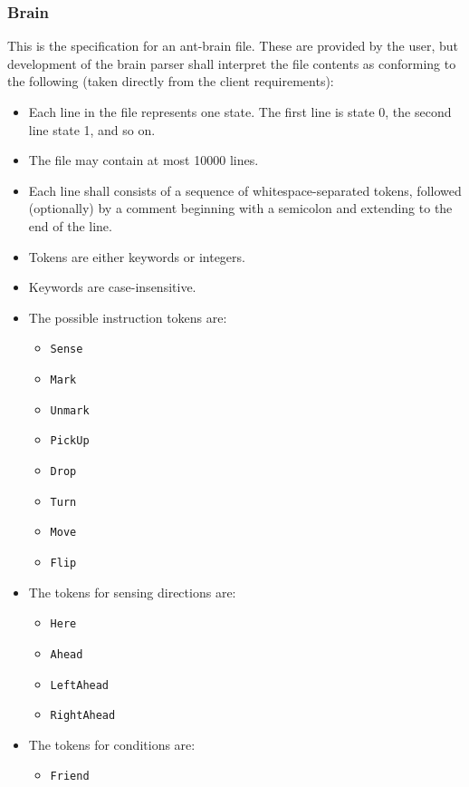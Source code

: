 \documentclass[11pt]{article}
\providecommand{\tightlist}{%
  \setlength{\itemsep}{0pt}\setlength{\parskip}{0pt}}
\begin{document}
\subsubsection{Brain}\label{ant-brain}

This is the specification for an ant-brain file. These are provided by
the user, but development of the brain parser shall interpret the file
contents as conforming to the following (taken directly from the client
requirements):

\begin{itemize}
\tightlist
\item
  Each line in the file represents one state. The first line is state 0,
  the second line state 1, and so on.
\item
  The file may contain at most 10000 lines.
\item
  Each line shall consists of a sequence of whitespace-separated tokens,
  followed (optionally) by a comment beginning with a semicolon and
  extending to the end of the line.
\item
  Tokens are either keywords or integers.
\item
  Keywords are case-insensitive.
\item
  The possible instruction tokens are:
  \begin{itemize}
  \tightlist
  \item
  \texttt{Sense}
\item
  \texttt{Mark}
\item
  \texttt{Unmark}
\item
  \texttt{PickUp}
\item
  \texttt{Drop}
\item
  \texttt{Turn}
\item
  \texttt{Move}
\item
  \texttt{Flip}
  \end{itemize}
\item
  The tokens for sensing directions are:
  \begin{itemize}\tightlist
  \item
  \texttt{Here}
\item
  \texttt{Ahead}
\item
  \texttt{LeftAhead}
\item
  \texttt{RightAhead}
  \end{itemize}
\item
  The tokens for conditions are:
    \begin{itemize}\tightlist
\item
  \texttt{Friend}

\end{itemize}
\end{itemize}
\end{document}
